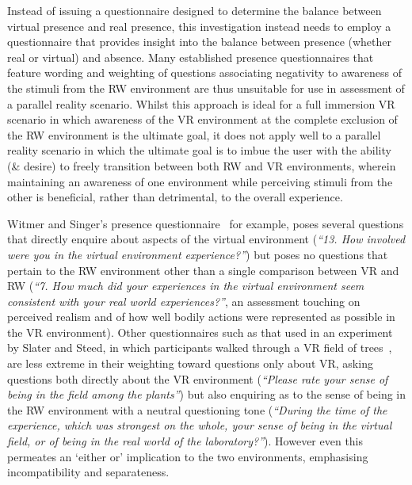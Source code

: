 Instead of issuing a questionnaire designed to determine the balance between virtual presence and real presence, this investigation instead needs to employ a questionnaire that provides insight into the balance between presence (whether real or virtual) and absence. Many established presence questionnaires that feature wording and weighting of questions associating negativity to awareness of the stimuli from the RW environment are thus unsuitable for use in assessment of a parallel reality scenario. Whilst this approach is ideal for a full immersion VR scenario in which awareness of the VR environment at the complete exclusion of the RW environment is the ultimate goal, it does not apply well to a parallel reality scenario in which the ultimate goal is to imbue the user with the ability (\& desire) to freely transition between both RW and VR environments, wherein maintaining an awareness of one environment while perceiving stimuli from the other is beneficial, rather than detrimental, to the overall experience.

Witmer and Singer's presence questionnaire~\cite{Witmer1998} for example, poses several questions that directly enquire about aspects of the virtual environment (\textit{``13. How involved were you in the virtual environment experience?''}) but poses no questions that pertain to the RW environment other than a single comparison between VR and RW (\textit{``7. How much did your experiences in the virtual environment seem consistent with your real world experiences?''}, an assessment touching on perceived realism and of how well bodily actions were represented as possible in the VR environment). Other questionnaires such as that used in an experiment by Slater and Steed, in which participants walked through a VR field of trees~\cite{Slater1998}, are less extreme in their weighting toward questions only about VR, asking questions both directly about the VR environment (\textit{``Please rate your sense of being in the field among the plants''}) but also enquiring as to the sense of being in the RW environment with a neutral questioning tone (\textit{``During the time of the experience, which was strongest on the whole, your sense of being in the virtual field, or of being in the real world of the laboratory?''}). However even this permeates an `either or' implication to the two environments, emphasising incompatibility and separateness.


